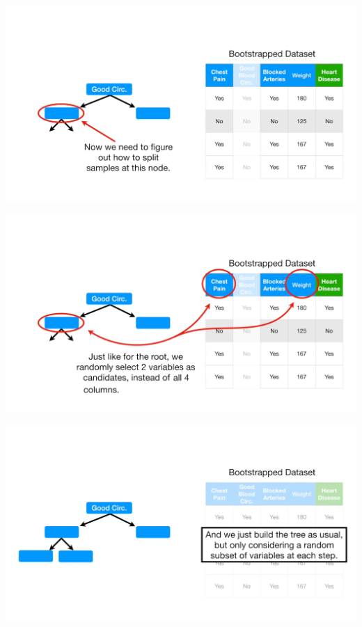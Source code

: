 \documentclass[
  ignorenonframetext,
]{beamer}
\begin{document}
\begin{frame}{}
\protect\hypertarget{section-29}{}
\includegraphics{images/r30.png}
\end{frame}

\begin{frame}{}
\protect\hypertarget{section-30}{}
\includegraphics{images/r31.png}
\end{frame}

\begin{frame}{}
\protect\hypertarget{section-31}{}
\includegraphics{images/r32.png}
\end{frame}
\end{document}
